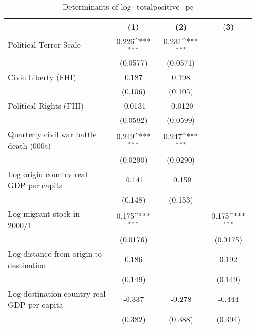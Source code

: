 \begin{table}[htbp]\centering
\def\sym#1{\ifmmode^{#1}\else\(^{#1}\)\fi}
\caption{Determinants of log\_totalpositive\_pc}
\begin{tabular}{l*{3}{c}}
\hline\hline
                    &\multicolumn{1}{c}{(1)}         &\multicolumn{1}{c}{(2)}         &\multicolumn{1}{c}{(3)}         \\
\hline
Political Terror Scale&       0.226\sym{***}&       0.231\sym{***}&                     \\
                    &    (0.0577)         &    (0.0571)         &                     \\
[1em]
Civic Liberty (FHI) &       0.187         &       0.198         &                     \\
                    &     (0.106)         &     (0.105)         &                     \\
[1em]
Political Rights (FHI)&     -0.0131         &     -0.0120         &                     \\
                    &    (0.0582)         &    (0.0599)         &                     \\
[1em]
Quarterly civil war battle death (000s)&       0.249\sym{***}&       0.247\sym{***}&                     \\
                    &    (0.0290)         &    (0.0290)         &                     \\
[1em]
Log origin country real GDP per capita&      -0.141         &      -0.159         &                     \\
                    &     (0.148)         &     (0.153)         &                     \\
[1em]
Log migrant stock in 2000/1&       0.175\sym{***}&                     &       0.175\sym{***}\\
                    &    (0.0176)         &                     &    (0.0175)         \\
[1em]
Log distance from origin to destination&       0.186         &                     &       0.192         \\
                    &     (0.149)         &                     &     (0.149)         \\
[1em]
Log destination country real GDP per capita&      -0.337         &      -0.278         &      -0.444         \\
                    &     (0.382)         &     (0.388)         &     (0.394)         \\

\end{tabular}
\end{table}
